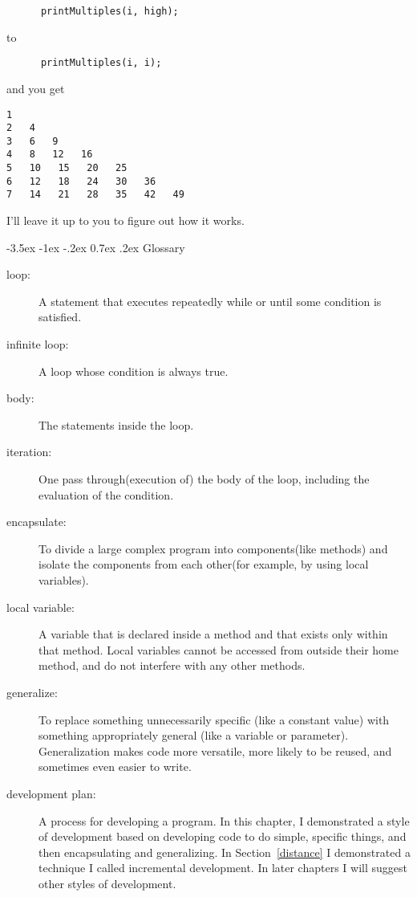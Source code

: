 \documentclass{book}
\makeatletter
\renewcommand{\section}{\@startsection 
    {section} {1} {0mm}%
    {-3.5ex \@plus -1ex \@minus -.2ex}%
    {0.7ex \@plus.2ex}%
    {\normalfont\Large\bfseries}}
\makeatother
\begin{document}
\begin{verbatim}
      printMultiples(i, high);
\end{verbatim}
%
to

\begin{verbatim}
      printMultiples(i, i);
\end{verbatim}
%
and you get

\begin{verbatim}
1   
2   4   
3   6   9   
4   8   12   16   
5   10   15   20   25   
6   12   18   24   30   36   
7   14   21   28   35   42   49  
\end{verbatim}
%
I'll leave it up to you to figure out how it works.

\section{Glossary}

\begin{description}

\item[loop:]  A statement that executes repeatedly while or
until some condition is satisfied.

\item[infinite loop:]  A loop whose condition is always true.

\item[body:]  The statements inside the loop.

\item[iteration:]  One pass through(execution of) the body
of the loop, including the evaluation of the condition.

\item[encapsulate:]  To divide a large complex program into
components(like methods) and isolate the components from
each other(for example, by using local variables).

\item[local variable:]  A variable that is declared inside
a method and that exists only within that method.  Local variables
cannot be accessed from outside their home method, and do not
interfere with any other methods.

\item[generalize:]  To replace something unnecessarily specific
(like a constant value) with something appropriately general
(like a variable or parameter).  Generalization makes code more
versatile, more likely to be reused, and sometimes even easier
to write.

\item[development plan:]  A process for developing a program.
In this chapter, I demonstrated a style of development based on
developing code to do simple, specific things, and then encapsulating
and generalizing.  In Section~\ref{distance} I demonstrated a
technique I called incremental development.  In later chapters I will
suggest other styles of development.


\end{description}
\end{document}
